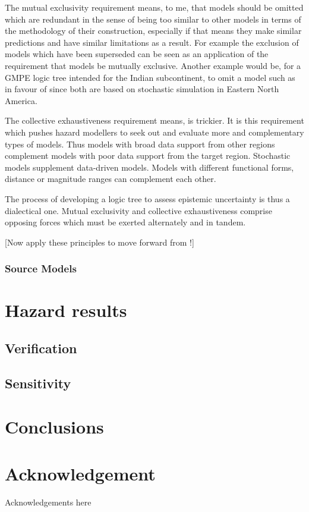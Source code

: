 \documentclass{article}
\begin{document}
The mutual exclusivity requirement means, to me, that models should be omitted which are redundant in the sense of being too similar to other models in terms of the methodology of their construction, especially if that means they make similar predictions and have similar limitations as a result. For example the exclusion of models which have been superseded \citep{cotton2006criteria} can be seen as an application of the requirement that models be mutually exclusive. Another example would be, for a GMPE logic tree intended for the Indian subcontinent, to omit a model such as \cite{hwang1997attenuation} in favour of \cite{atkinson2006earthquake} since both are based on stochastic simulation in Eastern North America.

The collective exhaustiveness requirement means, is trickier. It is this requirement which pushes hazard modellers to seek out and evaluate more and complementary types of models. Thus models with broad data support from other regions complement models with poor data support from the target region. Stochastic models supplement data-driven models. Models with different functional forms, distance or magnitude ranges can complement each other.

The process of developing a logic tree to assess epistemic uncertainty is thus a dialectical one. Mutual exclusivity and collective exhaustiveness comprise opposing forces which must be exerted alternately and in tandem.

[Now apply these principles to move forward from \cite{nath2012probabilistic}!] 

\subsubsection{Source Models}
\label{subsubsec:SourceModelWeights}

\section{Hazard results}
\label{sec:Hazard}

\subsection{Verification}
\label{sec:Verification}

\subsection{Sensitivity}
\label{subsec:Sensitivity}

\section{Conclusions}
\label{sec:Conclusions}

\section*{Acknowledgement}
Acknowledgements here





\end{document}
